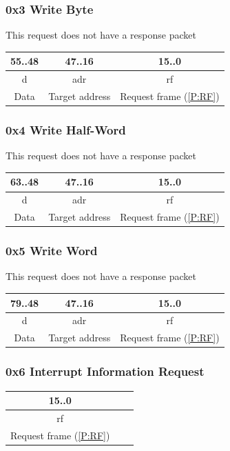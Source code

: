 \documentclass[a4paper,10pt]{article}
\begin{document}
\subsubsection{0x3 Write Byte}
This request does not have a response packet

\begin{table}[H]
	\centering
	{
		\begin{tabular}{|c|c|c|}
\hline
55..48 & 47..16 & 15..0 \\
\hline
d & adr & rf \\
\hline
Data & Target address & Request frame (\ref{P:RF}) \\
\hline
		\end{tabular}
	}
\end{table}

\subsubsection{0x4 Write Half-Word}
This request does not have a response packet

\begin{table}[H]
	\centering
	{
		\begin{tabular}{|c|c|c|}
\hline
63..48 & 47..16 & 15..0 \\
\hline
d & adr & rf \\
\hline
Data & Target address & Request frame (\ref{P:RF}) \\
\hline
		\end{tabular}
	}
\end{table}

\subsubsection{0x5 Write Word}
This request does not have a response packet

\begin{table}[H]
	\centering
	{
		\begin{tabular}{|c|c|c|}
\hline
79..48 & 47..16 & 15..0 \\
\hline
d & adr & rf \\
\hline
Data & Target address & Request frame (\ref{P:RF}) \\
\hline
		\end{tabular}
	}
\end{table}

\subsubsection{0x6 Interrupt Information Request} \label{P:IIRQ}
\begin{table}[H]
	\centering
	{
		\begin{tabular}{|c|c|c|}
\hline
15..0 \\
\hline
rf \\
\hline
Request frame (\ref{P:RF}) \\
\hline
		\end{tabular}
	}
\end{table}
\end{document}
